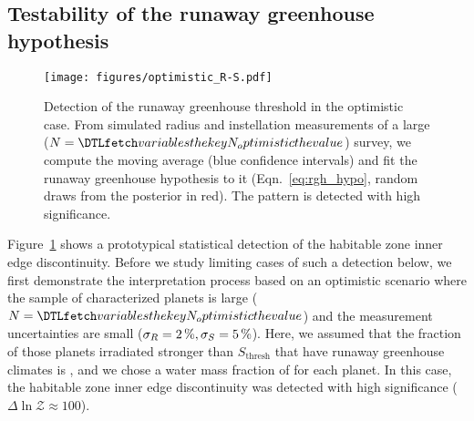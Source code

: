 \documentclass[twocolumn,twocolappendix]{aastex631}
\begin{document}
\subsection{Testability of the runaway greenhouse hypothesis}\label{sec:res_testability}
\begin{figure}[ht!]
    \begin{centering}
        \texttt{[image: figures/optimistic\_R-S.pdf]}
        \caption{
        Detection of the runaway greenhouse threshold in the optimistic case.
        From simulated radius and instellation measurements of a large ($N = \var{N_optimistic}$) survey, we compute the moving average (blue confidence intervals) and fit the runaway greenhouse hypothesis to it (Eqn.~\ref{eq:rgh_hypo}, random draws from the posterior in red).
            The pattern is detected with high significance.
        }
        \label{fig:optimistic_R-S}
    \end{centering}
\end{figure}
Figure~\ref{fig:optimistic_R-S} shows a prototypical statistical detection of the habitable zone inner edge discontinuity.
Before we study limiting cases of such a detection below, we first demonstrate the interpretation process based on an optimistic scenario where the sample of characterized planets is large ($N = \var{N_optimistic}$) and the measurement uncertainties are small ($\sigma_{R} = \SI{2}{\percent}, \sigma_{S} = \SI{5}{\percent}$).
Here, we assumed that the fraction of those planets irradiated stronger than $S_\mathrm{thresh}$ that have runaway greenhouse climates is \frgh, and we chose a water mass fraction of  for each planet.
In this case, the habitable zone inner edge discontinuity was detected with high significance ($\Delta \ln \mathcal{Z} \approx 100$).
\end{document}
